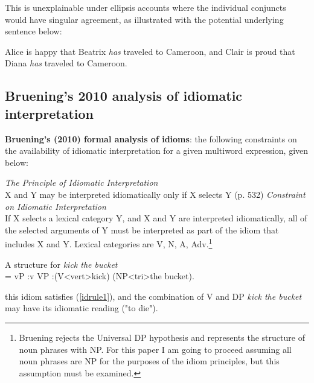 \documentclass[paper=letter, fontsize=12pt]{scrartcl} %
\numberwithin{equation}{section} %
\numberwithin{figure}{section} %
\numberwithin{table}{section} %
\begin{document}
This is unexplainable under ellipsis accounts where the individual conjuncts would have singular agreement, as illustrated with the potential underlying sentence below:

\begin{exe}
\ex Alice is happy that Beatrix \textit{has} traveled to Cameroon, and Clair is proud that Diana \textit{has} traveled to Cameroon.
\end{exe}



\subsection{Bruening's 2010 analysis of idiomatic interpretation}


\textbf{Bruening's (2010) formal analysis of idioms}: the following constraints on the availability of idiomatic interpretation for a given multiword expression, given below:

\begin{exe}
\ex\label{idrule1} \textit{The Principle of Idiomatic Interpretation} \\ X and Y may be interpreted idiomatically only if X selects Y \hspace*{\fill} (p. 532)
\ex\label{idrule2} \textit{Constraint on Idiomatic Interpretation} \\ If X selects a lexical category Y, and X and Y are interpreted idiomatically, all of the selected arguments of Y must be interpreted as part of the idiom that includes X and Y.
\ex\label{idrule3} Lexical categories are V, N, A, Adv.\footnote{Bruening rejects the Universal DP hypothesis and represents the structure of noun phrases with NP. For this paper I am going to proceed assuming all noun phrases are NP for the purposes of the idiom principles, but this assumption must be examined.}
\end{exe}


\begin{exe}
\ex\label{idex2} A structure for \textit{kick the bucket} \\
\jtree[xunit=2.8em,yunit=1em]
\! = {vP}
	:{v} {VP}
	:({V}<vert>{kick}) ({NP}<tri>{the bucket}).
\endjtree
\end{exe}

this idiom satisfies (\ref{idrule1}), and the combination of V and DP \textit{kick the bucket} may have its idiomatic reading ("to die").




\newpage
\end{document}

